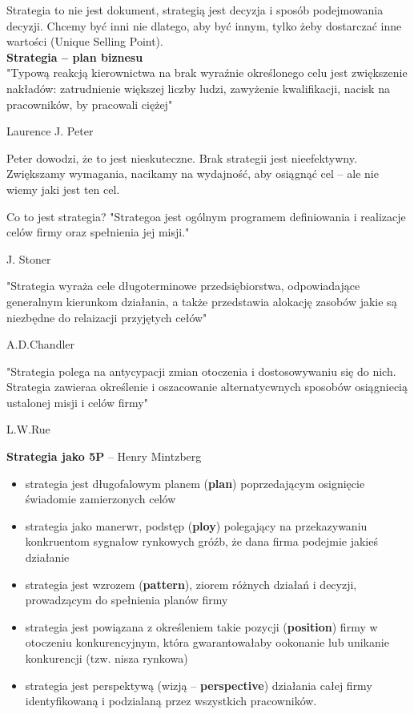 \documentclass[a4paper,10pt]{report}
\begin{document}
Strategia to nie jest dokument, strategią jest decyzja i sposób podejmowania decyzji. Chcemy być inni nie dlatego, aby być innym, tylko żeby dostarczać inne wartości (Unique Selling Point).\\

\textbf{Strategia -- plan biznesu} \\
"Typową reakcją kierownictwa na brak wyraźnie określonego celu jest zwiększenie nakładów: zatrudnienie większej liczby ludzi, zawyżenie kwalifikacji, nacisk na pracowników, by pracowali ciężej"
\begin{flushright}
	Laurence J. Peter
\end{flushright}

Peter dowodzi, że to jest nieskuteczne. Brak strategii jest nieefektywny. Zwiększamy wymagania, nacikamy na wydajność, aby osiągnąć cel -- ale nie wiemy jaki jest ten cel. 

Co to jest strategia?
"Strategoa jest ogólnym programem definiowania i realizacje celów firmy oraz spełnienia jej misji."
\begin{flushright}
	J. Stoner
\end{flushright}

"Strategia wyraża cele długoterminowe przedsiębiorstwa, odpowiadające generalnym kierunkom działania, a także przedstawia alokację zasobów jakie są niezbędne do relaizacji przyjętych cełów"
\begin{flushright}
	A.D.Chandler
\end{flushright}

"Strategia polega na antycypacji zmian otoczenia i dostosowywaniu się do nich. Strategia zawieraa określenie i oszacowanie alternatycwnych sposobów osiągniecią ustalonej misji i celów firmy"
\begin{flushright}
	L.W.Rue
\end{flushright}

\textbf{Strategia jako 5P} -- Henry Mintzberg
\begin{itemize}
	\item strategia jest długofalowym planem (\textbf{plan}) poprzedającym osignięcie świadomie zamierzonych celów
	\item strategia jako manerwr, podstęp (\textbf{ploy}) polegający na przekazywaniu konkruentom sygnałow rynkowych gróźb, że dana firma podejmie jakieś działanie
	\item strategia jest wzrozem (\textbf{pattern}), ziorem różnych działań i decyzji, prowadzącym do spełnienia planów firmy
	\item strategia jest powiązana z określeniem takie pozycji (\textbf{position}) firmy w otoczeniu konkurencyjnym, która gwarantowałaby ookonanie lub unikanie konkurencji (tzw. nisza rynkowa)
	\item strategia jest perspektywą (wizją -- \textbf{perspective}) działania całej firmy identyfikowaną i podzialaną przez wszystkich pracowników.
\end{itemize}
\end{document}
